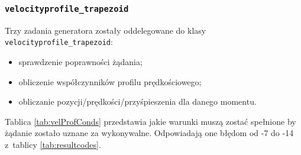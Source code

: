 \documentclass[a4paper, 12pt]{article}
\begin{document}
	\subsubsection{\texttt{velocityprofile\_trapezoid}}
	Trzy zadania generatora zostały oddelegowane do klasy \texttt{velocityprofile\_trapezoid}:
	\begin{itemize}
	\item sprawdzenie poprawności żądania;
	\item obliczenie współczynników profilu prędkościowego; 
	\item obliczanie pozycji/prędkości/przyśpieszenia dla danego momentu.
	\end{itemize}
	Tablica \ref{tab:velProfConds} przedstawia jakie warunki muszą zostać spełnione by żądanie zostało uznane za wykonywalne. Odpowiadają one błędom od -7 do -14 z~tablicy \ref{tab:resultcodes}.
\end{document}

